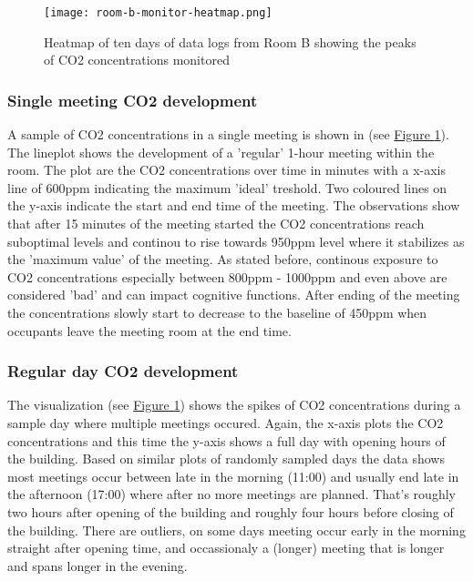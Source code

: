 \begin{figure}[h]
    \centering
    \texttt{[image: room-b-monitor-heatmap.png]}
    \caption{Heatmap of ten days of data logs from Room B showing the peaks of CO2 concentrations monitored }
    \label{fig:complexity}
\end{figure}

\subsubsection{Single meeting CO2 development}

A sample of CO2 concentrations in a single meeting is shown in (see \hyperref[fig:complexity]{Figure \ref*{fig:complexity}}). The lineplot shows the development of a 'regular' 1-hour meeting within the room. The plot are the CO2 concentrations over time in minutes with a x-axis line of 600ppm indicating the maximum 'ideal' treshold. Two coloured lines on the y-axis indicate the start and end time of the meeting. The observations show that after 15 minutes of the meeting started the CO2 concentrations reach suboptimal levels and continou to rise towards 950ppm level where it stabilizes as the 'maximum value' of the meeting. As stated before, continous exposure to CO2 concentrations especially between 800ppm - 1000ppm and even above are considered 'bad' and can impact cognitive functions. After ending of the meeting the concentrations slowly start to decrease to the baseline of 450ppm when occupants leave the meeting room at the end time.

\subsubsection{Regular day CO2 development}

The visualization (see \hyperref[fig:complexity]{Figure \ref*{fig:complexity}}) shows the spikes of CO2 concentrations during a sample day where multiple meetings occured. Again, the x-axis plots the CO2 concentrations and this time the y-axis shows a full day with opening hours of the building. Based on similar plots of randomly sampled days the data shows most meetings occur between late in the morning (11:00) and usually end late in the afternoon (17:00) where after no more meetings are planned. That's roughly two hours after opening of the building and roughly four hours before closing of the building. There are outliers, on some days meeting occur early in the morning straight after opening time, and occassionaly a (longer) meeting that is longer and spans longer in the evening.

